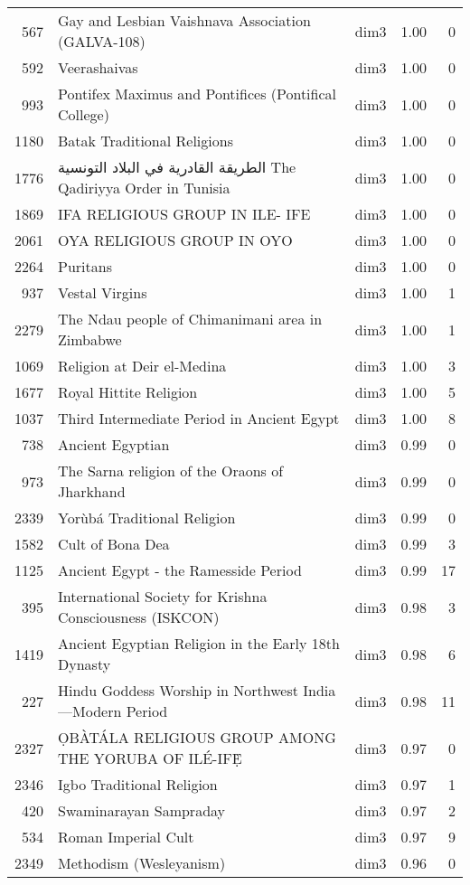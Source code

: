 \begin{tabular}{rllrr}
567 & Gay and Lesbian Vaishnava Association (GALVA-108) & dim3 & 1.00 & 0 \\
592 & Veerashaivas & dim3 & 1.00 & 0 \\
993 & Pontifex Maximus and Pontifices (Pontifical College) & dim3 & 1.00 & 0 \\
1180 & Batak Traditional Religions & dim3 & 1.00 & 0 \\
1776 & الطريقة القادرية في البلاد التونسية The Qadiriyya Order in Tunisia & dim3 & 1.00 & 0 \\
1869 & IFA RELIGIOUS GROUP IN ILE- IFE & dim3 & 1.00 & 0 \\
2061 & OYA RELIGIOUS GROUP IN OYO & dim3 & 1.00 & 0 \\
2264 & Puritans & dim3 & 1.00 & 0 \\
937 & Vestal Virgins & dim3 & 1.00 & 1 \\
2279 & The Ndau people of Chimanimani area in Zimbabwe & dim3 & 1.00 & 1 \\
1069 & Religion at Deir el-Medina & dim3 & 1.00 & 3 \\
1677 & Royal Hittite Religion & dim3 & 1.00 & 5 \\
1037 & Third Intermediate Period in Ancient Egypt & dim3 & 1.00 & 8 \\
738 & Ancient Egyptian & dim3 & 0.99 & 0 \\
973 & The Sarna religion of the Oraons of Jharkhand & dim3 & 0.99 & 0 \\
2339 & Yorùbá Traditional Religion & dim3 & 0.99 & 0 \\
1582 & Cult of Bona Dea & dim3 & 0.99 & 3 \\
1125 & Ancient Egypt - the Ramesside Period & dim3 & 0.99 & 17 \\
395 & International Society for Krishna Consciousness (ISKCON) & dim3 & 0.98 & 3 \\
1419 & Ancient Egyptian Religion in the Early 18th Dynasty & dim3 & 0.98 & 6 \\
227 & Hindu Goddess Worship in Northwest India—Modern Period & dim3 & 0.98 & 11 \\
2327 & ỌBÀTÁLA RELIGIOUS GROUP AMONG THE YORUBA OF ILÉ-IFẸ̀ & dim3 & 0.97 & 0 \\
2346 & Igbo Traditional Religion & dim3 & 0.97 & 1 \\
420 & Swaminarayan Sampraday & dim3 & 0.97 & 2 \\
534 & Roman Imperial Cult & dim3 & 0.97 & 9 \\
2349 & Methodism (Wesleyanism) & dim3 & 0.96 & 0 \\

\end{tabular}
